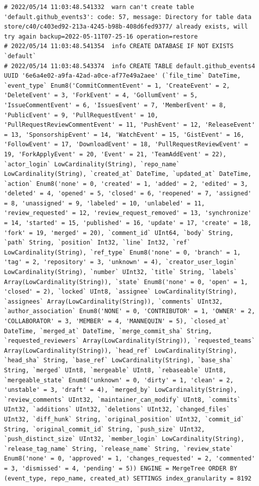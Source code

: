 \begin{verbatim}
# 2022/05/14 11:03:48.541332  warn can't create table 'default.github_events3': code: 57, message: Directory for table data store/c40/c403ed92-213a-4245-b98b-408d6fed9377/ already exists, will try again backup=2022-05-11T07-25-16 operation=restore
# 2022/05/14 11:03:48.541354  info CREATE DATABASE IF NOT EXISTS `default`
# 2022/05/14 11:03:48.543374  info CREATE TABLE default.github_events4 UUID '6e6a4e02-a9fa-42ad-a0ce-af77e49a2aee' (`file_time` DateTime, `event_type` Enum8('CommitCommentEvent' = 1, 'CreateEvent' = 2, 'DeleteEvent' = 3, 'ForkEvent' = 4, 'GollumEvent' = 5, 'IssueCommentEvent' = 6, 'IssuesEvent' = 7, 'MemberEvent' = 8, 'PublicEvent' = 9, 'PullRequestEvent' = 10, 'PullRequestReviewCommentEvent' = 11, 'PushEvent' = 12, 'ReleaseEvent' = 13, 'SponsorshipEvent' = 14, 'WatchEvent' = 15, 'GistEvent' = 16, 'FollowEvent' = 17, 'DownloadEvent' = 18, 'PullRequestReviewEvent' = 19, 'ForkApplyEvent' = 20, 'Event' = 21, 'TeamAddEvent' = 22), `actor_login` LowCardinality(String), `repo_name` LowCardinality(String), `created_at` DateTime, `updated_at` DateTime, `action` Enum8('none' = 0, 'created' = 1, 'added' = 2, 'edited' = 3, 'deleted' = 4, 'opened' = 5, 'closed' = 6, 'reopened' = 7, 'assigned' = 8, 'unassigned' = 9, 'labeled' = 10, 'unlabeled' = 11, 'review_requested' = 12, 'review_request_removed' = 13, 'synchronize' = 14, 'started' = 15, 'published' = 16, 'update' = 17, 'create' = 18, 'fork' = 19, 'merged' = 20), `comment_id` UInt64, `body` String, `path` String, `position` Int32, `line` Int32, `ref` LowCardinality(String), `ref_type` Enum8('none' = 0, 'branch' = 1, 'tag' = 2, 'repository' = 3, 'unknown' = 4), `creator_user_login` LowCardinality(String), `number` UInt32, `title` String, `labels` Array(LowCardinality(String)), `state` Enum8('none' = 0, 'open' = 1, 'closed' = 2), `locked` UInt8, `assignee` LowCardinality(String), `assignees` Array(LowCardinality(String)), `comments` UInt32, `author_association` Enum8('NONE' = 0, 'CONTRIBUTOR' = 1, 'OWNER' = 2, 'COLLABORATOR' = 3, 'MEMBER' = 4, 'MANNEQUIN' = 5), `closed_at` DateTime, `merged_at` DateTime, `merge_commit_sha` String, `requested_reviewers` Array(LowCardinality(String)), `requested_teams` Array(LowCardinality(String)), `head_ref` LowCardinality(String), `head_sha` String, `base_ref` LowCardinality(String), `base_sha` String, `merged` UInt8, `mergeable` UInt8, `rebaseable` UInt8, `mergeable_state` Enum8('unknown' = 0, 'dirty' = 1, 'clean' = 2, 'unstable' = 3, 'draft' = 4), `merged_by` LowCardinality(String), `review_comments` UInt32, `maintainer_can_modify` UInt8, `commits` UInt32, `additions` UInt32, `deletions` UInt32, `changed_files` UInt32, `diff_hunk` String, `original_position` UInt32, `commit_id` String, `original_commit_id` String, `push_size` UInt32, `push_distinct_size` UInt32, `member_login` LowCardinality(String), `release_tag_name` String, `release_name` String, `review_state` Enum8('none' = 0, 'approved' = 1, 'changes_requested' = 2, 'commented' = 3, 'dismissed' = 4, 'pending' = 5)) ENGINE = MergeTree ORDER BY (event_type, repo_name, created_at) SETTINGS index_granularity = 8192

\end{verbatim}
